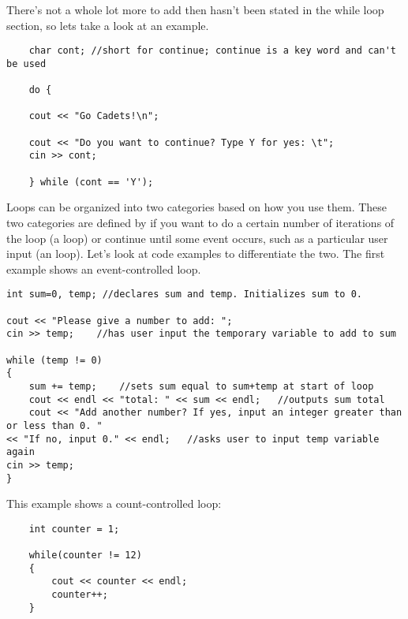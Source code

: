 There's not a whole lot more to add then hasn't been stated in the while loop section, so lets take a look at an example.

\begin{lstlisting}
    char cont; //short for continue; continue is a key word and can't be used

    do {

    cout << "Go Cadets!\n";

    cout << "Do you want to continue? Type Y for yes: \t";
    cin >> cont;

    } while (cont == 'Y');
\end{lstlisting}


Loops can be organized into two categories based on how you use them.
These two categories are defined by if you want to do a certain number of iterations of the loop (a  loop) or continue until some event occurs, such as a particular user input (an  loop).
Let's look at code examples to differentiate the two. The first example shows an event-controlled  loop.

\noindent\begin{minipage}{\textwidth}\begin{lstlisting}
int sum=0, temp; //declares sum and temp. Initializes sum to 0.

cout << "Please give a number to add: ";
cin >> temp;	//has user input the temporary variable to add to sum

while (temp != 0) 
{
	sum += temp;	//sets sum equal to sum+temp at start of loop
	cout << endl << "total: " << sum << endl;	//outputs sum total
	cout << "Add another number? If yes, input an integer greater than or less than 0. "
<< "If no, input 0." << endl;	//asks user to input temp variable again
cin >> temp;
}
\end{lstlisting}\end{minipage}

\noindent This example shows a count-controlled  loop:

\begin{lstlisting}
    int counter = 1;

    while(counter != 12)
    {
        cout << counter << endl;
        counter++;
    }
\end{lstlisting}


